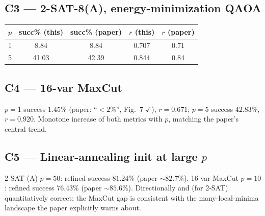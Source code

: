 \documentclass[11pt]{article}
\begin{document}
\subsection*{C3 --- 2-SAT-8(A), energy-minimization QAOA}
\begin{tabular}{lcccc}
\toprule
$p$ & succ\% (this) & succ\% (paper) & $r$ (this) & $r$ (paper) \\
\midrule
1 & 8.84 & 8.84 & 0.707 & 0.71 \\
5 & 41.03 & 42.39 & 0.844 & 0.84 \\
\bottomrule
\end{tabular}

\subsection*{C4 --- 16-var MaxCut}
$p{=}1$ success $1.45\%$ (paper: ``$<2\%$'', Fig.~7 $\checkmark$),
$r=0.671$; $p{=}5$ success $42.83\%$, $r=0.920$. Monotone increase of both
metrics with $p$, matching the paper's central trend.

\subsection*{C5 --- Linear-annealing init at large $p$}
2-SAT (A) $p{=}50$: refined success $81.24\%$ (paper $\sim 82.7\%$).
16-var MaxCut $p{=}10$: refined success $76.43\%$ (paper $\sim 85.6\%$).
Directionally and (for 2-SAT) quantitatively correct; the MaxCut gap is
consistent with the many-local-minima landscape the paper explicitly warns about.
\end{document}

